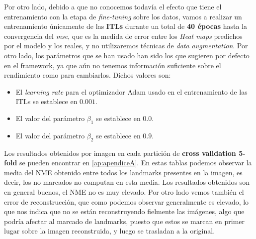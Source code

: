 
        \medskip

        \noindent Por otro lado, debido a que no conocemos todavía el efecto que tiene el entrenamiento con la etapa de \textit{fine-tuning} sobre los datos, vamos a realizar un entrenamiento únicamente de las \textbf{ITLs} durante un total de \textbf{40 épocas} hasta la convergencia del \textit{mse}, que es la medida de error entre los \textit{Heat maps} predichos por el modelo y los reales, y no utilizaremos técnicas de \textit{data augmentation}. Por otro lado, los parámetros que se han usado han sido los que sugieren por defecto en el framework, ya que aún no tenemos información suficiente sobre el rendimiento como para cambiarlos. Dichos valores son: 

        \begin{itemize}
            \item El \textit{learning rate} para el optimizador Adam usado en el entrenamiento de las ITLs se establece en $0.001$. 
            \item El valor del parámetro $\beta_1$ se establece en $0.0$.
            \item El valor del parámetro $\beta_2$ se establece en $0.9$.
        \end{itemize}

        \noindent Los resultados obtenidos por imagen en cada partición de \textbf{cross validation 5-fold } se pueden encontrar en \autoref{ap:apendiceA}. En estas tablas podemos observar la media del NME obtenido entre todos los landmarks presentes en la imagen, es decir, los no marcados no computan en esta media. Los resultados obtenidos son en general buenos, el NME no es muy elevado. Por otro lado vemos también el error de reconstrucción, que como podemos observar generalmente es elevado, lo que nos indica que no se están reconstruyendo fielmente las imágenes, algo que podría afectar al marcado de landmarks, puesto que estos se marcan en primer lugar sobre la imagen reconstruida, y luego se trasladan a la original.

